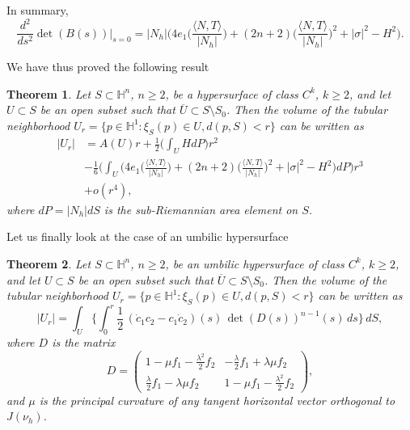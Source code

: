 \documentclass[10pt]{amsart}
\newtheorem{theorem}{Theorem}[section]
\theoremstyle{definition}
\theoremstyle{remark}
\numberwithin{equation}{section}
\begin{document}
In summary,
\[
\frac{d^2}{ds^2}\det(B(s))\bigg|_{s=0}\!\!\!\!={|N_{h}|}\bigg(4e_1\bigg({\frac{{\langle{N,T}\rangle}}{|N_h|}}\bigg)+(2n+2)\bigg({\frac{{\langle{N,T}\rangle}}{|N_h|}}\bigg)^2+|{\sigma}|^2-H^2\bigg).
\]

We have thus proved the following result

\begin{theorem}
\label{thm:steiner23}
Let $S\subset{{\mathbb{H}}}^n$, $n{\geqslant} 2$, be a hypersurface of class $C^k$, $k{\geqslant} 2$, and let $U\subset S$ be an open subset such that $\overline{U}\subset S\setminus S_0$. Then the volume of the tubular neighborhood $U_r=\{p\in{{\mathbb{H}}}^1:\xi_S(p)\in U, d(p,S)<r\}$ can be written as
\begin{equation}
\label{eq:steiner23}
\begin{split}
|U_r|&=A(U)r+\frac{1}{2}\bigg(\int_U HdP\bigg)r^2
\\
&-\frac{1}{6}\bigg(\int_U\bigg(4e_1\bigg({\frac{{\langle{N,T}\rangle}}{|N_h|}}\bigg)+(2n+2)\bigg({\frac{{\langle{N,T}\rangle}}{|N_h|}}\bigg)^2+|{\sigma}|^2-H^2\bigg)dP\bigg)r^3
\\
&+o(r^4),
\end{split}
\end{equation}
where $dP={|N_{h}|} dS$ is the sub-Riemannian area element on $S$.
\end{theorem}

Let us finally look at the case of an umbilic hypersurface

\begin{theorem}
\label{thm:umbilictube}
Let $S\subset{{\mathbb{H}}}^n$, $n{\geqslant} 2$, be an umbilic hypersurface of class $C^k$, $k{\geqslant} 2$, and let $U\subset S$ be an open subset such that $\overline{U}\subset S\setminus S_0$. Then the volume of the tubular neighborhood $U_r=\{p\in{{\mathbb{H}}}^1:\xi_S(p)\in U, d(p,S)<r\}$ can be written as
\begin{equation}
\label{eq:steinerumb}
|U_r|=\int_U\bigg\{\int_0^r\frac{1}{2}\,(\dot{c}_1c_2-c_1\dot{c}_2)(s)\,\det(D(s))^{n-1}(s)\,ds\bigg\}\,dS,
\end{equation}
where $D$ is the matrix
\[
D=\begin{pmatrix}
1-\mu f_1-\tfrac{{\lambda}^2}{2}f_2 & -\tfrac{\lambda}{2}f_1+{\lambda}\mu f_2 \\
\tfrac{\lambda}{2}f_1-{\lambda}\mu f_2 & 1-\mu f_1-\tfrac{{\lambda}^2}{2} f_2
\end{pmatrix},
\]
and $\mu$ is the principal curvature of any tangent horizontal vector orthogonal to $J({\nu_{h}})$.
\end{theorem}
\end{document}
